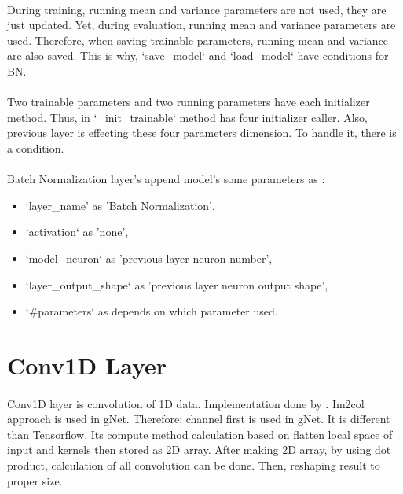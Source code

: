\documentclass[12pt]{report}
\begin{document}
\paragraph{}
During training, running mean and variance parameters are not used, they are just updated. Yet, during evaluation, running mean and variance parameters are used. Therefore, when saving trainable parameters, running mean and variance are also saved. This is why, `save\_model` and `load\_model` have conditions for BN.

\paragraph{}
Two trainable parameters and two running parameters have each initializer method. Thus, in `\_init\_trainable` method has four initializer caller. Also, previous layer is effecting these four parameters dimension. To handle it, there is a condition. 


\paragraph{}
Batch Normalization  layer's append model's some parameters as :

\begin{itemize}
	\item `layer\_name' as 'Batch Normalization',
	\item `activation` as 'none',
	\item `model\_neuron` as 'previous layer neuron number',
	\item `layer\_output\_shape` as 'previous layer neuron output shape',
	\item `\#parameters` as depends on which parameter used.
\end{itemize}



\section{Conv1D Layer}

\paragraph{}
Conv1D layer is convolution of 1D data. Implementation done by \cite{MGK}. Im2col approach is used in gNet. Therefore; channel first is used in gNet. It is different than Tensorflow. Its compute method calculation based on flatten local space of input and kernels then stored as 2D array. After making 2D array, by using dot product, calculation of all convolution can be done. Then, reshaping result to proper size. 
\end{document}
